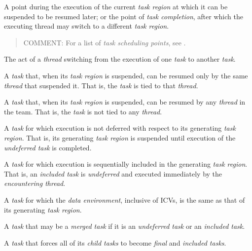 \glossarydefstart
A point during the execution of the current \emph{task region} at which it 
can be suspended to be resumed later; or the point of \emph{task completion}, 
after which the executing thread may switch to a different \emph{task region}.

\begin{quote}
COMMENT: For a list of \emph{task scheduling points}, see 
.
\end{quote}
\glossarydefend

\glossarydefstart
The act of a \emph{thread} switching from the execution of one \emph{task} 
to another \emph{task}.
\glossarydefend

\glossarydefstart
A \emph{task} that, when its \emph{task region} is suspended, can be resumed 
only by the same \emph{thread} that suspended it. That is, the \emph{task} 
is tied to that \emph{thread}.
\glossarydefend

\glossarydefstart
A \emph{task} that, when its \emph{task region} is suspended, can be resumed 
by any \emph{thread} in the team. That is, the \emph{task} is not tied to 
any \emph{thread}.
\glossarydefend

\glossarydefstart
A \emph{task} for which execution is not deferred with respect to its 
generating \emph{task} \emph{region}. That is, its generating 
\emph{task region} is suspended until execution of the
\emph{undeferred task} is completed.
\glossarydefend

\glossarydefstart
A \emph{task} for which execution is sequentially included in the 
generating \emph{task region}. That is, an \emph{included task} is 
\emph{undeferred} and executed immediately by the \emph{encountering thread}.
\glossarydefend

\glossarydefstart
A \emph{task} for which the \emph{data environment}, inclusive of ICVs, 
is the same as that of its generating \emph{task region}.
\glossarydefend

\glossarydefstart
A \emph{task} that may be a \emph{merged task} if it is an 
\emph{undeferred task} or an \emph{included task}.
\glossarydefend

\glossarydefstart
A \emph{task} that forces all of its \emph{child tasks} to become 
\emph{final} and \emph{included tasks}.
\glossarydefend


